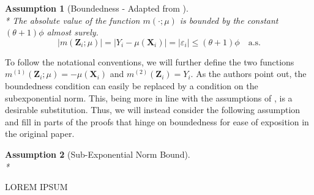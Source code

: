 \documentclass[letterpaper,10pt]{article}
\numberwithin{equation}{section}
\numberwithin{thm}{section}
\numberwithin{lem}{section}
\numberwithin{cor}{section}
\newtheorem{asm}{Assumption}
\newcommand{\1}{\mathbb{1}}
\begin{document}
\begin{asm}[Boundedness - Adapted from \citet{ritzwoller_uniform_2024}]\mbox{}\\*
	The absolute value of the function $m(\cdot; \mu)$ is bounded by the constant $(\theta+1) \phi$ almost surely.
	\begin{equation}
		|m(\mathbf{Z}_i ; \mu)|
		= |Y_i - \mu(\mathbf{X}_i)|
		= |\varepsilon_i|
		\leq (\theta+1) \phi
		\quad \text{a.s.}
	\end{equation}
\end{asm}
To follow the notational conventions, we will further define the two functions $m^{(1)}(\mathbf{Z}_i; \mu) = - \mu(\mathbf{X}_i)$ and $m^{(2)}(\mathbf{Z}_i) = Y_i$.
As the authors point out, the boundedness condition can easily be replaced by a condition on the subexponential norm.
This, being more in line with the assumptions of \citet{demirkaya_optimal_2024}, is a desirable substitution.
Thus, we will instead consider the following assumption and fill in parts of the proofs that hinge on boundedness for ease of exposition in the original paper.


\begin{asm}[Sub-Exponential Norm Bound]\mbox{}\\*

\end{asm}

{\color{red} LOREM IPSUM}

% 


\end{document}
